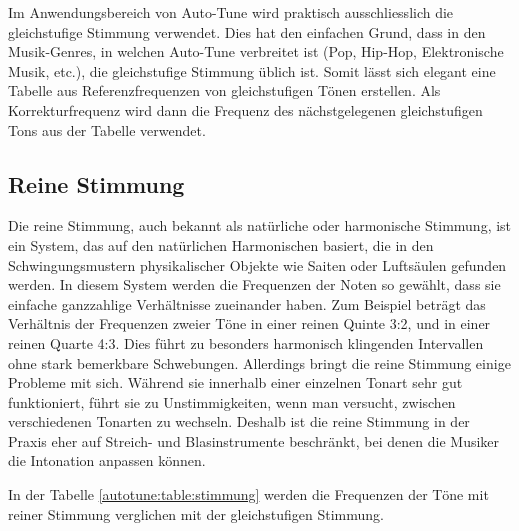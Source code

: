 Im Anwendungsbereich von Auto-Tune wird praktisch ausschliesslich die gleichstufige Stimmung verwendet.
Dies hat den einfachen Grund, dass in den Musik-Genres, in welchen Auto-Tune verbreitet ist (Pop, Hip-Hop, Elektronische Musik, etc.), die gleichstufige Stimmung üblich ist.
Somit lässt sich elegant eine Tabelle aus Referenzfrequenzen von gleichstufigen Tönen erstellen.
Als Korrekturfrequenz wird dann die Frequenz des nächstgelegenen gleichstufigen Tons aus der Tabelle verwendet.


\subsection{Reine Stimmung
\label{autotune:subsection:reineStimmung}}
Die reine Stimmung, auch bekannt als natürliche oder harmonische Stimmung, ist ein System,
%
%
das auf den natürlichen Harmonischen basiert, die in den Schwingungsmustern physikalischer Objekte wie Saiten oder Luftsäulen gefunden werden.
In diesem System werden die Frequenzen der Noten so gewählt, dass sie einfache ganzzahlige Verhältnisse zueinander haben.
Zum Beispiel beträgt das Verhältnis der Frequenzen zweier Töne in einer reinen Quinte 3:2, und in einer reinen Quarte 4:3.
Dies führt zu besonders harmonisch klingenden Intervallen ohne stark bemerkbare Schwebungen.
Allerdings bringt die reine Stimmung einige Probleme mit sich.
Während sie innerhalb einer einzelnen Tonart sehr gut funktioniert, führt sie zu Unstimmigkeiten,
wenn man versucht, zwischen verschiedenen Tonarten zu wechseln.
Deshalb ist die reine Stimmung in der Praxis eher auf Streich- und Blasinstrumente beschränkt,
bei denen die Musiker die Intonation anpassen können.

In der Tabelle \ref{autotune:table:stimmung} werden die Frequenzen der Töne mit reiner Stimmung verglichen mit der gleichstufigen Stimmung.

